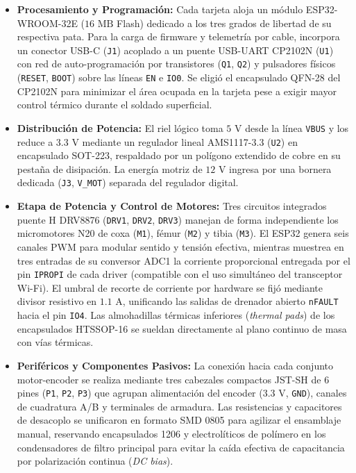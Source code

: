 \begin{itemize}
    \item \textbf{Procesamiento y Programación:} Cada tarjeta aloja un módulo ESP32-WROOM-32E ($16\text{ MB}$ Flash) dedicado a los tres grados de libertad de su respectiva pata. Para la carga de firmware y telemetría por cable, incorpora un conector USB-C (\texttt{J1}) acoplado a un puente USB-UART CP2102N (\texttt{U1}) con red de auto-programación por transistores (\texttt{Q1}, \texttt{Q2}) y pulsadores físicos (\texttt{RESET}, \texttt{BOOT}) sobre las líneas \texttt{EN} e \texttt{IO0}. Se eligió el encapsulado QFN-28 del CP2102N para minimizar el área ocupada en la tarjeta pese a exigir mayor control térmico durante el soldado superficial.
    \item \textbf{Distribución de Potencia:} El riel lógico toma $5\text{ V}$ desde la línea \texttt{VBUS} y los reduce a $3.3\text{ V}$ mediante un regulador lineal AMS1117-3.3 (\texttt{U2}) en encapsulado SOT-223, respaldado por un polígono extendido de cobre en su pestaña de disipación. La energía motriz de $12\text{ V}$ ingresa por una bornera dedicada (\texttt{J3}, \texttt{V\_MOT}) separada del regulador digital.
    \item \textbf{Etapa de Potencia y Control de Motores:} Tres circuitos integrados puente H DRV8876 (\texttt{DRV1}, \texttt{DRV2}, \texttt{DRV3}) manejan de forma independiente los micromotores N20 de coxa (\texttt{M1}), fémur (\texttt{M2}) y tibia (\texttt{M3}). El ESP32 genera seis canales PWM para modular sentido y tensión efectiva, mientras muestrea en tres entradas de su conversor ADC1 la corriente proporcional entregada por el pin \texttt{IPROPI} de cada driver (compatible con el uso simultáneo del transceptor Wi-Fi). El umbral de recorte de corriente por hardware se fijó mediante divisor resistivo en $1.1\text{ A}$, unificando las salidas de drenador abierto \texttt{nFAULT} hacia el pin \texttt{IO4}. Las almohadillas térmicas inferiores (\textit{thermal pads}) de los encapsulados HTSSOP-16 se sueldan directamente al plano continuo de masa con vías térmicas.
    \item \textbf{Periféricos y Componentes Pasivos:} La conexión hacia cada conjunto motor-encoder se realiza mediante tres cabezales compactos JST-SH de 6 pines (\texttt{P1}, \texttt{P2}, \texttt{P3}) que agrupan alimentación del encoder ($3.3\text{ V}$, \texttt{GND}), canales de cuadratura A/B y terminales de armadura. Las resistencias y capacitores de desacoplo se unificaron en formato SMD 0805 para agilizar el ensamblaje manual, reservando encapsulados 1206 y electrolíticos de polímero en los condensadores de filtro principal para evitar la caída efectiva de capacitancia por polarización continua (\textit{DC bias}).
\end{itemize}

